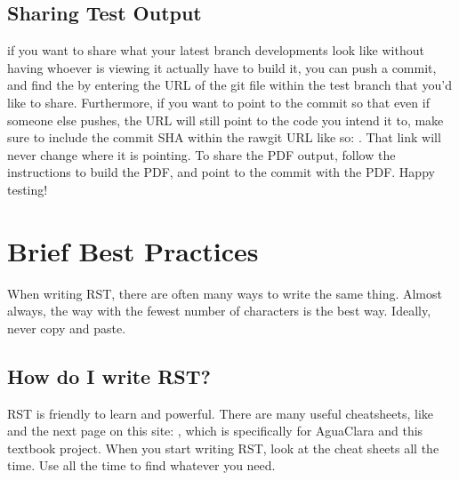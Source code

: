 \documentclass[letterpaper,10pt,english]{sphinxmanual}
\begin{document}
\subsection{Sharing Test Output}
\label{\detokenize{Textbook_Creation_Help/rst_intro:sharing-test-output}}
if you want to share what your latest branch developments look like without having whoever is viewing it actually have to build it, you can push a commit, and find the  by entering the URL of the git file within the test branch that you’d like to share. Furthermore, if you want to point to the commit so that even if someone else pushes, the URL will still point to the code you intend it to, make sure to include the commit SHA within the rawgit URL like so: . That link will never change where it is pointing. To share the PDF output, follow the {\hyperref[\detokenize{Textbook_Creation_Help/rst_intro:testing-online}]{}} instructions to build the PDF, and point to the commit with the PDF. Happy testing!


\section{Brief Best Practices}
\label{\detokenize{Textbook_Creation_Help/rst_intro:brief-best-practices}}\label{\detokenize{Textbook_Creation_Help/rst_intro:id5}}
When writing RST, there are often many ways to write the same thing. Almost always, the way with the fewest number of characters is the best way. Ideally, never copy and paste.


\subsection{How do I write RST?}
\label{\detokenize{Textbook_Creation_Help/rst_intro:how-do-i-write-rst}}\label{\detokenize{Textbook_Creation_Help/rst_intro:id6}}
RST is friendly to learn and powerful. There are many useful cheatsheets, like  and the next page on this site: , which is specifically for AguaClara and this textbook project. When you start writing RST, look at the cheat sheets all the time. Use  all the time to find whatever you need.
\end{document}
